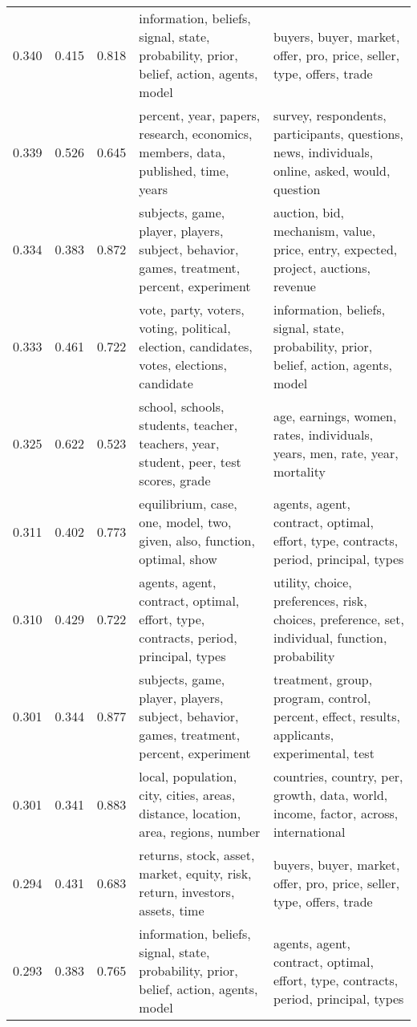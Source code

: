 \begin{tabular}{cccp{5cm}p{5cm}}
0.340 & 0.415 & 0.818 & information, beliefs, signal, state, probability, prior, belief, action, agents, model & buyers, buyer, market, offer, pro, price, seller, type, offers, trade \\
0.339 & 0.526 & 0.645 & percent, year, papers, research, economics, members, data, published, time, years & survey, respondents, participants, questions, news, individuals, online, asked, would, question \\
0.334 & 0.383 & 0.872 & subjects, game, player, players, subject, behavior, games, treatment, percent, experiment & auction, bid, mechanism, value, price, entry, expected, project, auctions, revenue \\
0.333 & 0.461 & 0.722 & vote, party, voters, voting, political, election, candidates, votes, elections, candidate & information, beliefs, signal, state, probability, prior, belief, action, agents, model \\
0.325 & 0.622 & 0.523 & school, schools, students, teacher, teachers, year, student, peer, test scores, grade & age, earnings, women, rates, individuals, years, men, rate, year, mortality \\
0.311 & 0.402 & 0.773 & equilibrium, case, one, model, two, given, also, function, optimal, show & agents, agent, contract, optimal, effort, type, contracts, period, principal, types \\
0.310 & 0.429 & 0.722 & agents, agent, contract, optimal, effort, type, contracts, period, principal, types & utility, choice, preferences, risk, choices, preference, set, individual, function, probability \\
0.301 & 0.344 & 0.877 & subjects, game, player, players, subject, behavior, games, treatment, percent, experiment & treatment, group, program, control, percent, effect, results, applicants, experimental, test \\
0.301 & 0.341 & 0.883 & local, population, city, cities, areas, distance, location, area, regions, number & countries, country, per, growth, data, world, income, factor, across, international \\
0.294 & 0.431 & 0.683 & returns, stock, asset, market, equity, risk, return, investors, assets, time & buyers, buyer, market, offer, pro, price, seller, type, offers, trade \\
0.293 & 0.383 & 0.765 & information, beliefs, signal, state, probability, prior, belief, action, agents, model & agents, agent, contract, optimal, effort, type, contracts, period, principal, types \\

\end{tabular}
